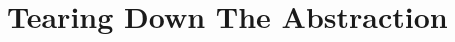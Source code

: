 \documentclass[pdftex,12pt,a4papaer,twoside,notitlepage]{report}
\DeclareMathOperator{\combine}{\mathtt{LCombine}}
\begin{document}
% 
% 
% 
% 
% 
% 
% 
% 
% 

\section{Tearing Down The Abstraction}
\end{document}
